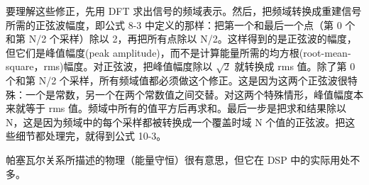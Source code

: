 要理解这些修正，先用 DFT
求出信号的频域表示。然后，把频域转换成重建信号所需的正弦波幅度，即公式
8-3 中定义的那样：把第一个和最后一个点（第 0 个和第 N/2 个采样）除以
2，再把所有点除以 N/2。这样得到的是正弦波的幅度，但它们是峰值幅度(peak
amplitude)，而不是计算能量所需的均方根(root-mean-square，rms)幅度。对正弦波，把峰值幅度除以
\(\sqrt{2}\) 就转换成 rms 值。除了第 0 个和第 N/2
个采样，所有频域值都必须做这个修正。这是因为这两个正弦波很特殊：一个是常数，另一个在两个常数值之间交替。对这两个特殊情形，峰值幅度本来就等于
rms 值。频域中所有的值平方后再求和。最后一步是把求和结果除以
N，这是因为频域中的每个采样都被转换成一个覆盖时域 N
个值的正弦波。把这些细节都处理完，就得到公式 10-3。

帕塞瓦尔关系所描述的物理（能量守恒）很有意思，但它在 DSP
中的实际用处不多。
